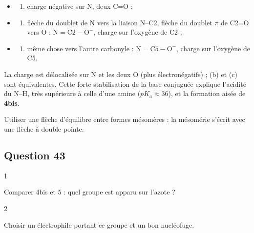 \documentclass[11pt,a4paper]{article}
\providecommand{\tightlist}{\setlength{\itemsep}{0pt}\setlength{\parskip}{0pt}}
\begin{document}
\begin{itemize}
\item
  \begin{enumerate}
  \def\labelenumi{(\alph{enumi})}
  \tightlist
  \item
    charge négative sur N, deux C=O ;
  \end{enumerate}
\item
  \begin{enumerate}
  \def\labelenumi{(\alph{enumi})}
  \setcounter{enumi}{1}
  \tightlist
  \item
    flèche du doublet de N vers la liaison N--C2, flèche du doublet \(\pi\) de C2=O vers O : \(\mathrm{N{=}C2{-}O^-}\), charge sur l'oxygène de C2 ;
  \end{enumerate}
\item
  \begin{enumerate}
  \def\labelenumi{(\alph{enumi})}
  \setcounter{enumi}{2}
  \tightlist
  \item
    même chose vers l'autre carbonyle : \(\mathrm{N{=}C5{-}O^-}\), charge sur l'oxygène de C5.
  \end{enumerate}
\end{itemize}

La charge est délocalisée sur N et les deux O (plus électronégatifs) ; (b) et (c) sont équivalentes. Cette forte stabilisation de la base conjuguée explique l'acidité du N--H, très supérieure à celle d'une amine (\(pK_a\approx36\)), et la formation aisée de \textbf{4bis}.

\begin{piege}

Utiliser une flèche d'équilibre entre formes mésomères : la mésomérie s'écrit avec une flèche à double pointe.

\end{piege}

\hypertarget{question-43}{%
\subsection{Question 43}\label{question-43}}

\begin{indication}{1}

Comparer 4bis et 5 : quel groupe est apparu sur l'azote ?

\end{indication}

\begin{indication}{2}

Choisir un électrophile portant ce groupe et un bon nucléofuge.

\end{indication}
\end{document}
